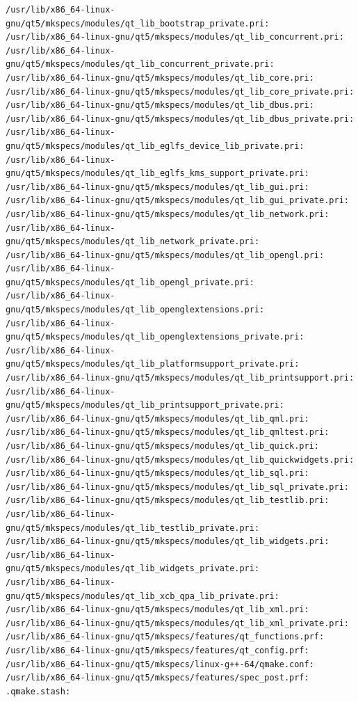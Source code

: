 \documentclass[a4paper]{article}
\begin{document}
\begin{verbatim}
/usr/lib/x86_64-linux-gnu/qt5/mkspecs/modules/qt_lib_bootstrap_private.pri:
/usr/lib/x86_64-linux-gnu/qt5/mkspecs/modules/qt_lib_concurrent.pri:
/usr/lib/x86_64-linux-gnu/qt5/mkspecs/modules/qt_lib_concurrent_private.pri:
/usr/lib/x86_64-linux-gnu/qt5/mkspecs/modules/qt_lib_core.pri:
/usr/lib/x86_64-linux-gnu/qt5/mkspecs/modules/qt_lib_core_private.pri:
/usr/lib/x86_64-linux-gnu/qt5/mkspecs/modules/qt_lib_dbus.pri:
/usr/lib/x86_64-linux-gnu/qt5/mkspecs/modules/qt_lib_dbus_private.pri:
/usr/lib/x86_64-linux-gnu/qt5/mkspecs/modules/qt_lib_eglfs_device_lib_private.pri:
/usr/lib/x86_64-linux-gnu/qt5/mkspecs/modules/qt_lib_eglfs_kms_support_private.pri:
/usr/lib/x86_64-linux-gnu/qt5/mkspecs/modules/qt_lib_gui.pri:
/usr/lib/x86_64-linux-gnu/qt5/mkspecs/modules/qt_lib_gui_private.pri:
/usr/lib/x86_64-linux-gnu/qt5/mkspecs/modules/qt_lib_network.pri:
/usr/lib/x86_64-linux-gnu/qt5/mkspecs/modules/qt_lib_network_private.pri:
/usr/lib/x86_64-linux-gnu/qt5/mkspecs/modules/qt_lib_opengl.pri:
/usr/lib/x86_64-linux-gnu/qt5/mkspecs/modules/qt_lib_opengl_private.pri:
/usr/lib/x86_64-linux-gnu/qt5/mkspecs/modules/qt_lib_openglextensions.pri:
/usr/lib/x86_64-linux-gnu/qt5/mkspecs/modules/qt_lib_openglextensions_private.pri:
/usr/lib/x86_64-linux-gnu/qt5/mkspecs/modules/qt_lib_platformsupport_private.pri:
/usr/lib/x86_64-linux-gnu/qt5/mkspecs/modules/qt_lib_printsupport.pri:
/usr/lib/x86_64-linux-gnu/qt5/mkspecs/modules/qt_lib_printsupport_private.pri:
/usr/lib/x86_64-linux-gnu/qt5/mkspecs/modules/qt_lib_qml.pri:
/usr/lib/x86_64-linux-gnu/qt5/mkspecs/modules/qt_lib_qmltest.pri:
/usr/lib/x86_64-linux-gnu/qt5/mkspecs/modules/qt_lib_quick.pri:
/usr/lib/x86_64-linux-gnu/qt5/mkspecs/modules/qt_lib_quickwidgets.pri:
/usr/lib/x86_64-linux-gnu/qt5/mkspecs/modules/qt_lib_sql.pri:
/usr/lib/x86_64-linux-gnu/qt5/mkspecs/modules/qt_lib_sql_private.pri:
/usr/lib/x86_64-linux-gnu/qt5/mkspecs/modules/qt_lib_testlib.pri:
/usr/lib/x86_64-linux-gnu/qt5/mkspecs/modules/qt_lib_testlib_private.pri:
/usr/lib/x86_64-linux-gnu/qt5/mkspecs/modules/qt_lib_widgets.pri:
/usr/lib/x86_64-linux-gnu/qt5/mkspecs/modules/qt_lib_widgets_private.pri:
/usr/lib/x86_64-linux-gnu/qt5/mkspecs/modules/qt_lib_xcb_qpa_lib_private.pri:
/usr/lib/x86_64-linux-gnu/qt5/mkspecs/modules/qt_lib_xml.pri:
/usr/lib/x86_64-linux-gnu/qt5/mkspecs/modules/qt_lib_xml_private.pri:
/usr/lib/x86_64-linux-gnu/qt5/mkspecs/features/qt_functions.prf:
/usr/lib/x86_64-linux-gnu/qt5/mkspecs/features/qt_config.prf:
/usr/lib/x86_64-linux-gnu/qt5/mkspecs/linux-g++-64/qmake.conf:
/usr/lib/x86_64-linux-gnu/qt5/mkspecs/features/spec_post.prf:
.qmake.stash:

\end{verbatim}
\end{document}
